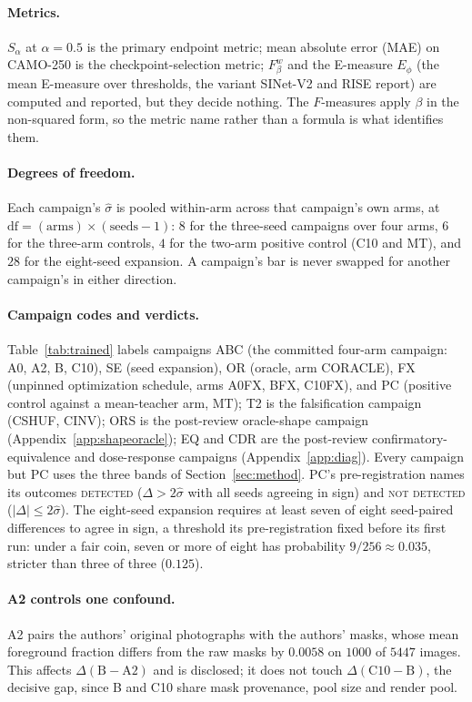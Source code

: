 \documentclass{article}
\newif\ifrevmarked \revmarkedtrue
\DeclareRobustCommand{\revA}[1]{\ifrevmarked{\color{RevA}#1}\else{#1}\fi}
\DeclareRobustCommand{\revB}[1]{\ifrevmarked{\color{RevB}#1}\else{#1}\fi}
\DeclareRobustCommand{\revShared}[1]{\ifrevmarked{\color{RevShared}#1}\else{#1}\fi}
\begin{document}
\paragraph{Metrics.} $S_\alpha$ at $\alpha = 0.5$ is the primary endpoint metric; mean absolute
error (MAE) on CAMO-250 is the checkpoint-selection metric; $F_\beta^w$ and the E-measure $E_\phi$
\revA{(the mean E-measure over thresholds, the variant SINet-V2 and RISE report)} are computed and reported, but they decide
nothing.
The $F$-measures apply $\beta$ in the non-squared form, so the metric name rather than a formula is what identifies them.

\paragraph{Degrees of freedom.} Each campaign's $\hat{\sigma}$ is pooled within-arm across that
campaign's own arms, at $\mathrm{df} = (\text{arms}) \times (\text{seeds} - 1)$: $8$ for the
three-seed campaigns over four arms, $6$ for the three-arm controls, $4$ for the two-arm positive
control (C10 and MT), and $28$ for the eight-seed expansion. A campaign's bar is never swapped for another campaign's in either direction.

\paragraph{Campaign codes and verdicts.} Table~\ref{tab:trained} labels campaigns ABC (the committed
four-arm campaign: A0, A2, B, C10), SE (seed expansion), OR (oracle, arm CORACLE), FX (unpinned
optimization schedule, arms A0FX, BFX, C10FX), and PC (positive control against a mean-teacher arm,
MT); T2 is the falsification campaign (CSHUF, CINV)\revB{; ORS is the post-review oracle-shape campaign
(Appendix~\ref{app:shapeoracle})}\revShared{; EQ and CDR are the post-review confirmatory-equivalence and dose-response
campaigns (Appendix~\ref{app:diag})}. Every campaign but PC uses the three bands of
Section~\ref{sec:method}. PC's pre-registration names its outcomes \textsc{detected} ($\Delta > 2\hat{\sigma}$
with all seeds agreeing in sign) and \textsc{not detected} ($|\Delta| \le 2\hat{\sigma}$). \revA{The eight-seed expansion
requires at least seven of eight seed-paired differences to agree in sign, a threshold its pre-registration fixed
before its first run: under a fair coin, seven or more of eight has probability $9/256 \approx 0.035$, stricter than
three of three ($0.125$).}

\paragraph{A2 controls one confound.} A2 pairs the authors' original photographs with the
authors' masks, whose mean foreground fraction differs from the raw masks by $0.0058$ on $1000$ of
$5447$ images. This affects $\Delta(\mathrm{B}-\mathrm{A2})$ and is disclosed; it does not touch
$\Delta(\mathrm{C10}-\mathrm{B})$, the decisive gap, since B and C10 share mask provenance, pool
size and render pool.
\end{document}
